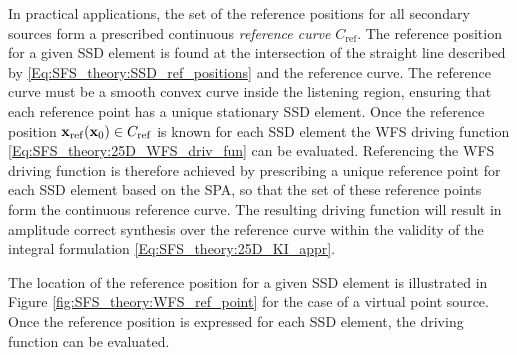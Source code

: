 In practical applications, the set of the reference positions for all secondary sources form a prescribed continuous \emph{reference curve} $C_{\mathrm{ref}}$. 
The reference position for a given SSD element is found at the intersection of the straight line described by \eqref{Eq:SFS_theory:SSD_ref_positions} and the reference curve.
The reference curve must be a smooth convex curve inside the listening region, ensuring that each reference point has a unique stationary SSD element.
Once the reference position $\mathbf{x}_{\mathrm{ref}}(\mathbf{x}_0) \in C_{\mathrm{ref}}$ is known for each SSD element the WFS driving function \eqref{Eq:SFS_theory:25D_WFS_driv_fun} can be evaluated.
Referencing the WFS driving function is therefore achieved by prescribing a unique reference point for each SSD element based on the SPA, so that the set of these reference points form the continuous reference curve.
The resulting driving function will result in amplitude correct synthesis over the reference curve within the validity of the integral formulation \eqref{Eq:SFS_theory:25D_KI_appr}.

The location of the reference position for a given SSD element is illustrated in Figure \ref{fig:SFS_theory:WFS_ref_point} for the case of a virtual point source. 
Once the reference position is expressed for each SSD element, the driving function can be evaluated.

